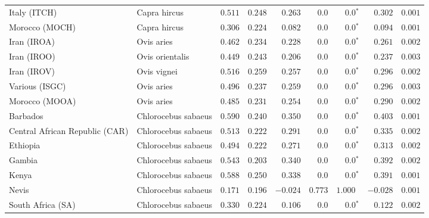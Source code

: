 \begin{center}
\begin{adjustbox}{width = 1\textwidth}
\begin{tabular}{|l|l|r|r|r|r|r|r|r|}
            Italy (ITCH)                    & Capra hircus          & $ 0.511$ & $ 0.248$ & $ 0.263$ & $0.0$    & $\bm{0.0{^*}}$    & $ 0.302$ & $ 0.001$  \\
            Morocco (MOCH)                    & Capra hircus     & $ 0.306$ & $ 0.224$ & $ 0.082$ & $0.0$    & $\bm{0.0{^*}}$    & $ 0.094$ & $ 0.001$ \\
            Iran (IROA)                    & Ovis aries         & $ 0.462$ & $ 0.234$ & $ 0.228$ & $0.0$    & $\bm{0.0{^*}}$    & $ 0.261$ & $ 0.002$ \\
            Iran (IROO)                 & Ovis orientalis          & $ 0.449$ & $ 0.243$ & $ 0.206$ & $0.0$    & $\bm{0.0{^*}}$    & $ 0.237$ & $ 0.003$ \\
            Iran (IROV)                 & Ovis vignei          & $ 0.516$ & $ 0.259$ & $ 0.257$ & $0.0$    & $\bm{0.0{^*}}$    & $ 0.296$ & $ 0.002$ \\
            Various (ISGC)                       & Ovis aries & $ 0.496$ & $ 0.237$ & $ 0.259$ & $0.0$    & $\bm{0.0{^*}}$    & $ 0.296$ & $ 0.003$ \\
            Morocco (MOOA) & Ovis aries & $ 0.485$ & $ 0.231$ & $ 0.254$ & $0.0$ & $\bm{0.0{^*}}$ & $ 0.290$ & $ 0.002$ \\
            Barbados                       & Chlorocebus sabaeus & $ 0.590$ & $ 0.240$ & $ 0.350$ & $0.0$    & $\bm{0.0{^*}}$    & $ 0.403$ & $ 0.001$ \\
            Central African Republic (CAR)                         & Chlorocebus sabaeus & $ 0.513$ & $ 0.222$ & $ 0.291$ & $0.0$    & $\bm{0.0{^*}}$    & $ 0.335$ & $ 0.002$ \\
            Ethiopia                          & Chlorocebus sabaeus & $ 0.494$ & $ 0.222$ & $ 0.271$ & $0.0$    & $\bm{0.0{^*}}$    & $ 0.313$ & $ 0.002$ \\
            Gambia                          & Chlorocebus sabaeus & $ 0.543$ & $ 0.203$ & $ 0.340$ & $0.0$ & $\bm{0.0{^*}}$        & $ 0.392$ & $ 0.002$ \\
            Kenya              & Chlorocebus sabaeus & $ 0.588$ & $ 0.250$ & $ 0.338$ & $0.0$    & $\bm{0.0{^*}}$ & $ 0.391$ & $ 0.001$ \\
            Nevis               & Chlorocebus sabaeus & $ 0.171$ & $ 0.196$ & $-0.024$ & $ 0.773$    & $ 1.000~~$ & $-0.028$ & $ 0.001$ \\
            South Africa (SA)                         & Chlorocebus sabaeus & $ 0.330$ & $ 0.224$ & $ 0.106$ & $0.0$    & $\bm{0.0{^*}}$    & $ 0.122$ & $ 0.002$ \\

\end{tabular}
\end{adjustbox}
\end{center}

